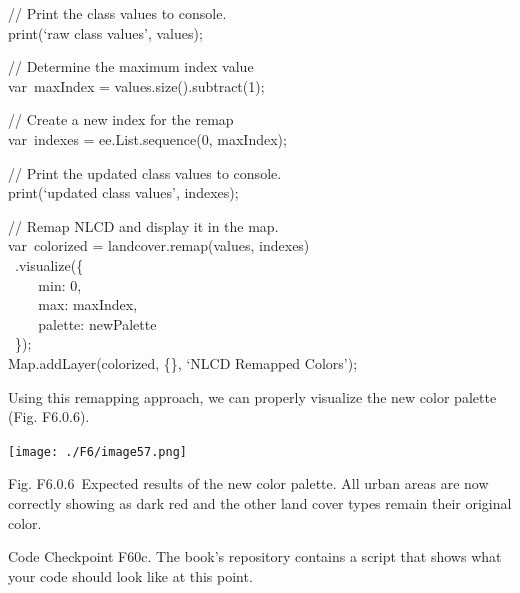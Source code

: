 \documentclass[
  letterpaper,
  DIV=11,
  numbers=noendperiod]{scrreprt}
\begin{document}
// Print the class values to console.\\
print(`raw class values', values);

// Determine the maximum index value\\
var~maxIndex = values.size().subtract(1);

// Create a new index for the remap\\
var~indexes = ee.List.sequence(0, maxIndex);

// Print the updated class values to console.\\
print(`updated class values', indexes);

// Remap NLCD and display it in the map.\\
var~colorized = landcover.remap(values, indexes)\\
\hspace*{0.333em} ~.visualize(\{\\
\hspace*{0.333em} ~ ~ ~min: 0,\\
\hspace*{0.333em} ~ ~ ~max: maxIndex,\\
\hspace*{0.333em} ~ ~ ~palette: newPalette\\
\hspace*{0.333em} ~\});\\
Map.addLayer(colorized, \{\}, `NLCD Remapped Colors');

Using this remapping approach, we can properly visualize the new color
palette (Fig. F6.0.6).

\texttt{[image: ./F6/image57.png]}

Fig. F6.0.6~Expected results of the new color palette. All urban areas
are now correctly showing as dark red and the other land cover types
remain their original color.

\begin{tcolorbox}[enhanced jigsaw, left=2mm, breakable, rightrule=.15mm, opacityback=0, colframe=quarto-callout-note-color-frame, colbacktitle=quarto-callout-note-color!10!white, arc=.35mm, opacitybacktitle=0.6, toptitle=1mm, colback=white, leftrule=.75mm, title=\textcolor{quarto-callout-note-color}{\faInfo}\hspace{0.5em}{Note}, toprule=.15mm, bottomtitle=1mm, titlerule=0mm, bottomrule=.15mm, coltitle=black]

Code Checkpoint F60c. The book's repository contains a script that shows
what your code should look like at this point.

\end{tcolorbox}
\end{document}
